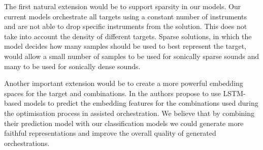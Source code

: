 \documentclass[runningheads,a4paper]{llncs}
\begin{document}
The first natural extension would be to support sparsity in our models. Our current models orchestrate all targets using a constant number of instruments and are not able to drop specific instruments from the solution. This does not take into account the density of different targets. Sparse solutions, in which the model decides how many samples should be used to best represent the target, would allow a small number of samples to be used for sonically sparse sounds and many to be used for sonically dense sounds. %

Another important extension would be to create a more powerful embedding spaces for the target and combinations. In \cite{Gillick19} the authors propose to use LSTM-based models to predict the embedding features for the combinations used during the optimisation process in assisted orchestration. We believe that by combining their prediction model with our classification models we could generate more faithful representations and improve the overall quality of generated orchestrations.
\end{document}
